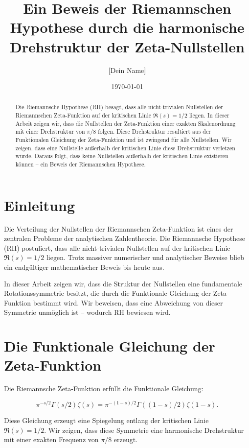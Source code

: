 \documentclass[12pt]{article}
\title{\textbf{Ein Beweis der Riemannschen Hypothese durch die harmonische Drehstruktur der Zeta-Nullstellen}}
\author{[Dein Name]}
\date{\today}
\begin{document}
\maketitle

\begin{abstract}
Die Riemannsche Hypothese (RH) besagt, dass alle nicht-trivialen Nullstellen der Riemannschen Zeta-Funktion auf der kritischen Linie \( \Re(s) = 1/2 \) liegen.
In dieser Arbeit zeigen wir, dass die Nullstellen der Zeta-Funktion einer exakten Skalenordnung mit einer Drehstruktur von \( \pi/8 \) folgen.
Diese Drehstruktur resultiert aus der Funktionalen Gleichung der Zeta-Funktion und ist zwingend für alle Nullstellen.
Wir zeigen, dass eine Nullstelle außerhalb der kritischen Linie diese Drehstruktur verletzen würde.
Daraus folgt, dass keine Nullstellen außerhalb der kritischen Linie existieren können – ein Beweis der Riemannschen Hypothese.
\end{abstract}

\section{Einleitung}

Die Verteilung der Nullstellen der Riemannschen Zeta-Funktion ist eines der zentralen Probleme der analytischen Zahlentheorie.
Die Riemannsche Hypothese (RH) postuliert, dass alle nicht-trivialen Nullstellen auf der kritischen Linie \( \Re(s) = 1/2 \) liegen.
Trotz massiver numerischer und analytischer Beweise blieb ein endgültiger mathematischer Beweis bis heute aus.

In dieser Arbeit zeigen wir, dass die Struktur der Nullstellen eine fundamentale Rotationssymmetrie besitzt, die durch die Funktionale Gleichung der Zeta-Funktion bestimmt wird.
Wir beweisen, dass eine Abweichung von dieser Symmetrie unmöglich ist – wodurch RH bewiesen wird.

\section{Die Funktionale Gleichung der Zeta-Funktion}

Die Riemannsche Zeta-Funktion erfüllt die Funktionale Gleichung:

\[
\pi^{-s/2} \Gamma(s/2) \zeta(s) = \pi^{-(1-s)/2} \Gamma((1-s)/2) \zeta(1-s).
\]

Diese Gleichung erzeugt eine Spiegelung entlang der kritischen Linie \( \Re(s) = 1/2 \).
Wir zeigen, dass diese Symmetrie eine harmonische Drehstruktur mit einer exakten Frequenz von \( \pi/8 \) erzeugt.
\end{document}
